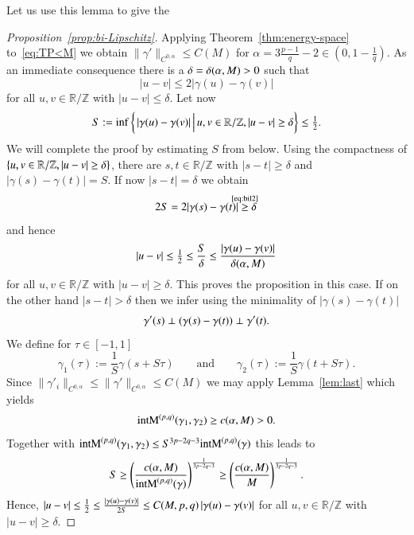 Let us use this lemma to give the

\begin{proof}[Proposition~\ref{prop:bi-Lipschitz}]
Applying Theorem~\ref{thm:energy-space} to~\eqref{eq:TP<M} we obtain
 $\|\gamma'\|_{C^{0,\alpha}} \leq C(M)$
 for $\alpha = 3\frac {p-1} q -2\in(0,1-\frac1q)$.
As an immediate consequence there is a $\delta=\delta(\alpha,M)>0$
such that
\begin{equation}\label{eq:bil2}
 |u-v| \leq 2 |\gamma(u)- \gamma(v)|
\end{equation}
for all $u,v \in \mathbb R / \mathbb Z$ with $|u-v| \leq \delta.$
Let now
\[ S := \inf \sets{\!\rule{0ex}{1em}\abs{\gamma(u)-\gamma(v)}}{u,v \in \R/\Z,\abs{u-v}\geq\delta} \leq \tfrac12. \]
 We will complete the proof by estimating $S$ from below.
 Using the compactness of $\left\{u,v \in \mathbb{R}/\mathbb{Z},\left|u-v\right|\geq\delta\right\}$,
 there are $s,t \in \mathbb R / \mathbb Z$ with 
$|s-t| \geq \delta$ and
 $|\gamma(s)-\gamma(t)| =S$.
If now $|s-t| =\delta$ we obtain
\begin{equation*}
 2 S = 2|\gamma (s) - \gamma(t)| \refeq[\ge]{bil2} \delta
\end{equation*}
and hence
\begin{equation*}
 |u-v| \leq \tfrac12 \le \frac S\delta \le \frac{\left|\gamma(u)-\gamma(v)\right|}{\delta(\alpha,M)}
\end{equation*}
for all $u,v \in \mathbb R / \mathbb Z$ with $|u-v| \geq \delta$.
This proves the proposition in this case.
%
If on the other hand $|s-t| > \delta$ then we infer using the
minimality of $|\gamma(s)-\gamma(t)|$
\begin{equation*}
 \gamma'(s) \perp (\gamma(s) - \gamma(t)) \perp \gamma'(t).
\end{equation*}
We define for $\tau \in [-1,1]$
\begin{equation*}
 \gamma_1 (\tau) := \frac 1 S \gamma(s+ S\tau)
 \qquad\text{and}\qquad
 \gamma_2(\tau) := \frac 1 S \gamma(t + S \tau).
\end{equation*}
Since 
$\| \gamma'_i\|_{C^{0,\alpha}} \leq \| \gamma'\|_{C^{0,\alpha}}
{\le C(M)}$
we may apply Lemma~\ref{lem:last} which yields
\begin{equation*}
 \mathrm{intM}^{(p,q)}(\gamma_1,\gamma_2) \geq c(\alpha,M) >0.
\end{equation*}
Together with 
 $\mathrm{intM}^{(p,q)} (\gamma_1, \gamma_2) \leq S^{3p-2q-3} \mathrm{intM}^{(p,q)} (\gamma)$
this leads to
\begin{equation*}
 S \geq \left( \frac {c(\alpha,M)}{\mathrm{intM}^{(p,q)}(\gamma)}\right)^{\frac 1 {3p-2q-3}}
 \ge\left(\frac{c(\alpha,M)}{M}\right)^{\frac1{3p-2q-3}}.
\end{equation*}
Hence,
$\left|u-v\right| \le\tfrac12\le\frac{\left|\gamma(u)-\gamma(v)\right|}{2S}
   \le C(M,p,q)\left|\gamma(u)-\gamma(v)\right|$
   for all $u,v \in \mathbb R / \mathbb Z$ with $|u-v| \geq \delta$.
\end{proof}

